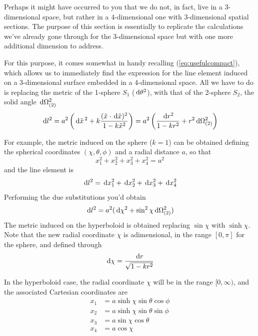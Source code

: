 Perhaps it might have occurred to you that we do not, in fact, live in a 3-dimensional space, but rather in a 4-dimensional one with 3-dimensional spatial sections. The purpose of this section is essentially to replicate the calculations we've already gone through for the 3-dimensional space but with one more additional dimension to address.
\par For this purpose, it comes somewhat in handy recalling (\ref{eq:usefulcompact}), which allows us to immediately find the expression for the line element induced on a 3-dimensional surface embedded in a 4-dimensional space. All we have to do is replacing the metric of the 1-sphere $S_{1}$ ($\,\text{d}\theta^{2}$), with that of the 2-sphere $S_{2}$, the solid angle $\,\text{d}\Omega_{(2)}^{2}$
\begin{equation}
    \,\text{d}l^{2} = a^{2}\left(\,\text{d}\tilde{x}^{\,2} + k \frac{(\tilde{x}\cdot\,\text{d}\tilde{x})^{2}}{1-k\tilde{x}^{2}}\right) = a^{2}\left(\frac{\,\text{d}r^{2}}{1-kr^{2}}+r^{2}\,\text{d}\Omega_{(2)}^{2}\right)
\end{equation}
\par For example, the metric induced on the sphere ($k=1$) can be obtained defining the spherical coordinates $(\chi, \theta, \phi)$ and a radial distance $a$, so that
\begin{equation}
    x_{1}^{2} + x_{2}^{2}+x_{3}^{2}+x_{4}^{2} = a^{2}
\end{equation}
and the line element is 
\begin{equation}
    \,\text{d}l^{2} = \,\text{d}x_{1}^{2}+\,\text{d}x_{2}^{2}+\,\text{d}x_{3}^{2} +\,\text{d}x_{4}^{2}
\end{equation}
Performing the due substitutions you'd obtain
\begin{equation}
    \,\text{d}l^{2} = a^{2}(\,\text{d}\chi^{2}+\sin^{2}\chi\,\text{d}\Omega_{(2)}^{2})
\end{equation}
The metric induced on the hyperboloid is obtained replacing $\sin\chi$ with $\sinh\chi$. Note that the new radial coordinate $\chi$ is adimensional, in the range $[0,\pi]$ for the sphere, and defined through
\begin{equation}
    \,\text{d}\chi = \frac{\,\text{d}r}{\sqrt{1-kr^{2}}}
    \label{eq:angularradius}
\end{equation}
\par In the hyperboloid case, the radial coordinate $\chi$ will be in the range $[0, \infty)$, and the associated Cartesian coordinates are
\begin{align*}
    x_{1} &= a\sinh\chi\sin\theta\cos\phi\\
    x_{2} &= a\sinh\chi\sin\theta\sin\phi\\
    x_{3} &= a\sin\chi\cos\theta\\
    x_{4} &= a\cos\chi
\end{align*}

